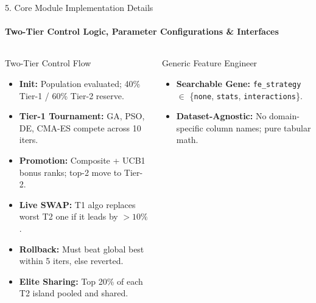 \documentclass[aspectratio=169, 11pt]{beamer}
\begin{document}
\begin{frame}{5. Core Module Implementation Details}
    \framesubtitle{Two-Tier Control Logic, Parameter Configurations \& Interfaces}
    \begin{columns}[T]
        \begin{block}{Two-Tier Control Flow}
            \scriptsize
            \begin{itemize}
                \setlength{\itemsep}{1pt}
                \item \textbf{Init:} Population evaluated; 40\% Tier-1 / 60\% Tier-2 reserve.
                \item \textbf{Tier-1 Tournament:} GA, PSO, DE, CMA-ES compete across 10 iters.
                \item \textbf{Promotion:} Composite + UCB1 bonus ranks; top-2 move to Tier-2.
                \item \textbf{Live SWAP:} T1 algo replaces worst T2 one if it leads by $>10\%$.
                \item \textbf{Rollback:} Must beat global best within 5 iters, else reverted.
                \item \textbf{Elite Sharing:} Top 20\% of each T2 island pooled and shared.
            \end{itemize}
        \end{block}

        \begin{block}{Generic Feature Engineer}
            \scriptsize
            \begin{itemize}
                \setlength{\itemsep}{1pt}
                \item \textbf{Searchable Gene:} \texttt{fe\_strategy} $\in$ \{\texttt{none}, \texttt{stats}, \texttt{interactions}\}.
                \item \textbf{Dataset-Agnostic:} No domain-specific column names; pure tabular math.
            \end{itemize}
        \end{block}


\end{columns}
\end{frame}
\end{document}
